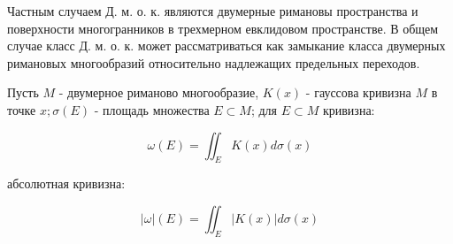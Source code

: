 \documentclass[10pt]{article}
\begin{document}
Частным случаем Д. м. о. к. являются двумерные римановы пространства и поверхности многогранников в трехмерном евклидовом пространстве. В общем случае класс Д. м. о. к. может рассматриваться как замыкание класса двумерных римановых многообразий относительно надлежащих предельных переходов.



Пусть $M$ - двумерное риманово многообразие, $K(x)$ - гауссова кривизна $M$ в точке $x ; \sigma(E)$ - площадь множества $E \subset M$; для $E \subset M$ кривизна:



\[

\omega(E)=\iint_{E} K(x) d \sigma(x)

\]



абсолютная кривизна:



\[

|\omega|(E)=\iint_{E}|K(x)| d \sigma(x)

\]
\end{document}
